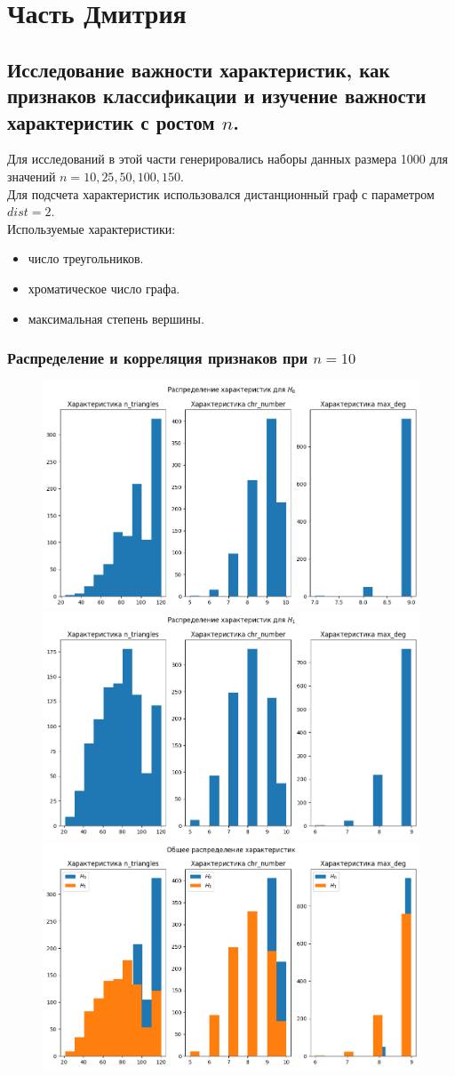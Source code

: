 \documentclass{report}
\begin{document}
\chapter{Часть Дмитрия}

\section{Исследование важности характеристик, как признаков классификации и изучение важности характеристик с ростом $n$.}

Для исследований в этой части генерировались наборы данных размера 1000 для значений $n = 10, 25, 50, 100, 150$.\\

Для подсчета характеристик использовался дистанционный граф с параметром $dist = 2$.\\

Используемые характеристики:
\begin{itemize}
    \item число треугольников.
    \item хроматическое число графа.
    \item максимальная степень вершины.
\end{itemize}
\newpage

\subsection{Распределение и корреляция признаков при $n = 10$}
\begin{figure}[h]
    \centering
    \includegraphics[width=0.4\linewidth]{n_10_h0_dist.png}
    \centering
    \includegraphics[width=0.4\linewidth]{n_10_h1_dist.png}
    \centering
    \includegraphics[width=0.4\linewidth]{n_10_common_dist.png}
\end{figure}
\end{document}
